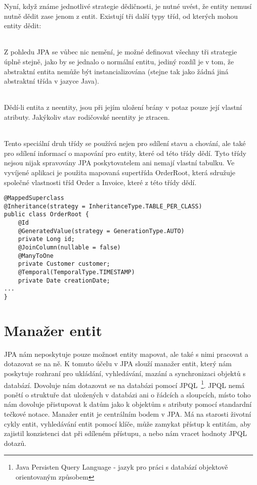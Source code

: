 \documentclass[122pt,oneside]{fithesis}
\begin{document}
Nyní, když známe jednotlivé strategie dědičnosti, je nutné uvést, že entity nemusí nutně dědit zase jenom z entit. Existují tři další typy tříd, od kterých mohou entity dědit:

\vspace{5 mm}
\\\indent Z pohledu JPA se vůbec nic nemění, je možné definovat všechny tři strategie úplně stejně, jako by se jednalo o normální entitu, jediný rozdíl je v tom, že abstraktní entita nemůže být instancializována (stejne tak jako žádná jiná abstraktní třída v jazyce Java).

\vspace{5 mm}
\\\indent Dědí-li entita z neentity, jsou při jejím uložení brány v potaz pouze její vlastní atributy. Jakýkoliv stav rodičovské neentity je ztracen.

\vspace{5 mm}
\\\indent Tento speciální druh třídy se používá nejen pro sdílení stavu a chování, ale také pro sdílení informací o mapování pro entity, které od této třídy dědí. Tyto třídy nejsou nijak spravovány JPA poskytovatelem ani nemají vlastní tabulku. Ve vyvíjené aplikaci je použita mapovaná supertřída OrderRoot, která sdružuje společné vlastnosti tříd Order a Invoice, které z této třídy dědí.

\begin{lstlisting}
@MappedSuperclass
@Inheritance(strategy = InheritanceType.TABLE_PER_CLASS)
public class OrderRoot {
	@Id
	@GeneratedValue(strategy = GenerationType.AUTO)
	private Long id;
	@JoinColumn(nullable = false)
	@ManyToOne
	private Customer customer;
	@Temporal(TemporalType.TIMESTAMP)
	private Date creationDate;
...
}
\end{lstlisting}

\section{Manažer entit}

JPA nám neposkytuje pouze možnost entity mapovat, ale také s nimi pracovat a dotazovat se na ně. K tomuto účelu v JPA slouží manažer entit, který nám poskytuje rozhraní pro ukládání, vyhledávání, mazání a synchronizaci objektů s databází. Dovoluje nám dotazovat se na databázi pomocí JPQL~\footnote{Java Persisten Query Language - jazyk pro práci s databází objektově orientovaným způsobem}. JPQL nemá ponětí o struktuře dat uložených v databázi ani o řádcích a sloupcích, místo toho nám dovoluje přistupovat k datům jako k objektům s atributy pomocí standardní tečkové notace. Manažer entit je centrálním bodem v JPA. Má na starosti životní cykly entit, vyhledávání entit pomocí klíče, může zamykat přístup k entitám, aby zajistil konzistenci dat při sdíleném přístupu, a nebo nám vracet hodnoty JPQL dotazů.
\end{document}
